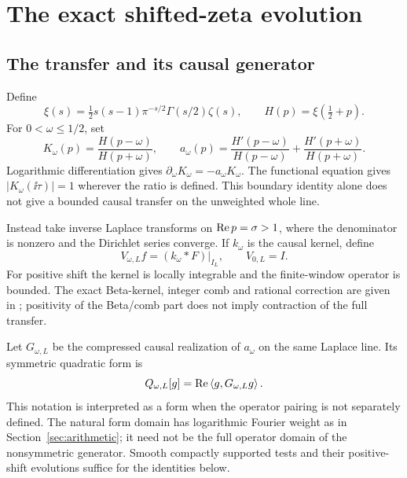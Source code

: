 \section{The exact shifted-zeta evolution}\label{sec:shift}

\subsection{The transfer and its causal generator}

Define
\begin{equation}
 \xi(s)=\tfrac12s(s-1)\pi^{-s/2}\Gamma(s/2)\zeta(s),
 \qquad H(p)=\xi(\tfrac12+p).
\end{equation}
For $0<\omega\leq1/2$, set
\begin{equation}\label{eq:transfer}
 K_\omega(p)=\frac{H(p-\omega)}{H(p+\omega)},\qquad
 a_\omega(p)=\frac{H'(p-\omega)}{H(p-\omega)}
             +\frac{H'(p+\omega)}{H(p+\omega)}.
\end{equation}
Logarithmic differentiation gives
$\partial_\omega K_\omega=-a_\omega K_\omega$.
The functional equation gives $|K_\omega(\ii\tau)|=1$ wherever
the ratio is defined. This boundary identity alone does not give
a bounded causal transfer on the unweighted whole line.

Instead take inverse Laplace transforms on $\operatorname{Re} p=\sigma>1$,
where the denominator is nonzero and the Dirichlet series converge.
If $k_\omega$ is the causal kernel, define
\begin{equation}
 V_{\omega,L}f=(k_\omega*F)|_{I_L},\qquad V_{0,L}=I.
\end{equation}
For positive shift the kernel is locally integrable and the
finite-window operator is bounded. The exact Beta-kernel, integer
comb and rational correction are given in
\cite[Section~S1.4]{Supplement}; positivity of the Beta/comb part
does not imply contraction of the full transfer.

Let $G_{\omega,L}$ be the compressed causal realization of
$a_\omega$ on the same Laplace line. Its symmetric quadratic form is
\begin{equation}\label{eq:Qomega}
 Q_{\omega,L}[g]=\operatorname{Re}\left\langle g,G_{\omega,L}g\right\rangle.
\end{equation}
This notation is interpreted as a form when the operator pairing
is not separately defined. The natural form domain has logarithmic
Fourier weight as in Section~\ref{sec:arithmetic}; it need not be
the full operator domain of the nonsymmetric generator.
Smooth compactly supported tests and their positive-shift
evolutions suffice for the identities below.


